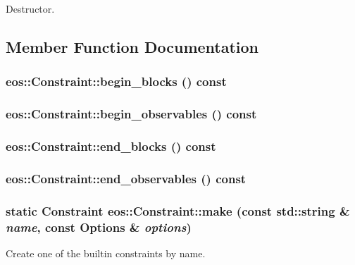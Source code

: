 Destructor. 

\subsection{Member Function Documentation}
\hypertarget{classeos_1_1Constraint_a0bc3a182079de99618a9edec6bfd8512}{
\subsubsection[{begin\_\-blocks}]{ eos::Constraint::begin\_\-blocks () const}}
\label{classeos_1_1Constraint_a0bc3a182079de99618a9edec6bfd8512}
\hypertarget{classeos_1_1Constraint_a9822827a09ecb630ec2b6640ce4306c0}{
\subsubsection[{begin\_\-observables}]{ eos::Constraint::begin\_\-observables () const}}
\label{classeos_1_1Constraint_a9822827a09ecb630ec2b6640ce4306c0}
\hypertarget{classeos_1_1Constraint_a8b6747caa6cf920d064e3a306224f4ef}{
\subsubsection[{end\_\-blocks}]{ eos::Constraint::end\_\-blocks () const}}
\label{classeos_1_1Constraint_a8b6747caa6cf920d064e3a306224f4ef}
\hypertarget{classeos_1_1Constraint_aa6cb38bbe55f1fd59f921716bc78d4c9}{
\subsubsection[{end\_\-observables}]{ eos::Constraint::end\_\-observables () const}}
\label{classeos_1_1Constraint_aa6cb38bbe55f1fd59f921716bc78d4c9}
\hypertarget{classeos_1_1Constraint_a5084265f8e196296a885089cf710c096}{
\subsubsection[{make}]{\setlength{\rightskip}{0pt plus 5cm}static {\bf Constraint} eos::Constraint::make (const std::string \& {\em name}, \/  const {\bf Options} \& {\em options})}}
\label{classeos_1_1Constraint_a5084265f8e196296a885089cf710c096}
Create one of the builtin constraints by name.


